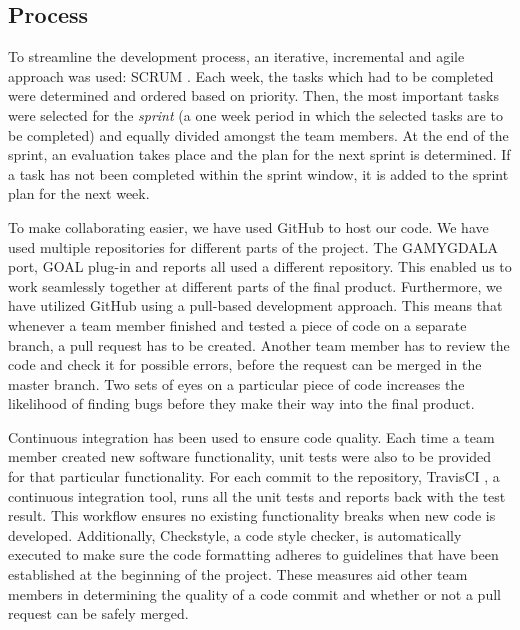 \subsection{Process}
To streamline the development process, an iterative, incremental and agile approach was used: SCRUM \citep{scrum}. Each week, the tasks which had to be completed were determined and ordered based on priority. Then, the most important tasks were selected for the \textit{sprint} (a one week period in which the selected tasks are to be completed) and equally divided amongst the team members. At the end of the sprint, an evaluation takes place and the plan for the next sprint is determined. If a task has not been completed within the sprint window, it is added to the sprint plan for the next week.

To make collaborating easier, we have used GitHub \citep{gh} to host our code. We have used multiple repositories for different parts of the project. The GAMYGDALA port, GOAL plug-in and reports all used a different repository. This enabled us to work seamlessly together at different parts of the final product. Furthermore, we have utilized GitHub using a pull-based development approach. This means that whenever a team member finished and tested a piece of code on a separate branch, a pull request has to be created. Another team member has to review the code and check it for possible errors, before the request can be merged in the master branch. Two sets of eyes on a particular piece of code increases the likelihood of finding bugs before they make their way into the final product. 

Continuous integration has been used to ensure code quality. Each time a team member created new software functionality, unit tests were also to be provided for that particular functionality. For each commit to the repository, TravisCI \citep{travis}, a continuous integration tool, runs all the unit tests and reports back with the test result. This workflow ensures no existing functionality breaks when new code is developed. Additionally, Checkstyle, a code style checker, is automatically executed to make sure the code formatting adheres to guidelines that have been established at the beginning of the project. These measures aid other team members in determining the quality of a code commit and whether or not a pull request can be safely merged.